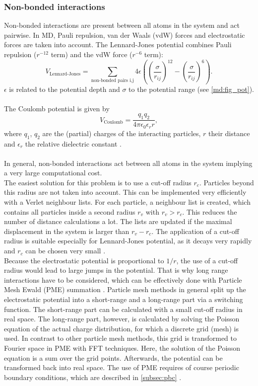\subsubsection{Non-bonded interactions}
Non-bonded interactions are present between all atoms in the system and act pairwise. In MD, Pauli repulsion, van der Waals (vdW) forces and electrostatic forces are taken into account.
The Lennard-Jones potential combines Pauli repulsion ($r^{-12}$ term) and the vdW force ($r^{-6}$ term):
\begin{equation}
V_\text{Lennard-Jones} = \sum_{\text{non-bonded pairs i,j}} 4 \epsilon\left(\left(\frac{\sigma}{r_{ij}}\right)^{12} - \left(\frac{\sigma}{r_{ij}}\right)^6\right).
\end{equation}
$\epsilon$ is related to the potential depth and $\sigma$ to the potential range (see \autoref{md:fig_pot}).\\
\\
The Coulomb potential is given by
\begin{equation}
V_\text{Coulomb} = \frac{q_1 q_2}{4 \pi \epsilon_0 \epsilon_r r},
\end{equation}
where $q_1$, $q_2$ are the (partial) charges of the interacting particles, $r$ their distance and $\epsilon_r$ the relative dielectric constant \autocite[p. 65-71]{gromacsManual}.\\
\\
In general, non-bonded interactions act between all atoms in the system implying a very large computational cost.\\
The easiest solution for this problem is to use a cut-off radius $r_c$. Particles beyond this radius are not taken into account. This can be implemented very efficiently with a Verlet neighbour lists. For each particle, a neighbour list is created, which contains all particles inside a second radius $r_v$ with $r_v > r_c$. This reduces the number of distance calculations a lot. The lists are updated if the maximal displacement in the system is larger than $r_v - r_c$.  The application of a cut-off radius is suitable especially for Lennard-Jones potential, as it decays very rapidly and $r_c$ can be chosen very small \autocite[p. 144]{greenBook}.\\
Because the electrostatic potential is proportional to $1/r$, the use of a cut-off radius would lead to large jumps in the potential. That is why long range interactions have to be considered, which can be effectively done with Particle Mesh Ewald (PME) summation \autocite{pme}. Particle mesh methods in general split up the electrostatic potential into a short-range and a long-range part via a switching function. The short-range part can be calculated with a small cut-off radius in real space. The long-range part, however, is calculated by solving the Poisson equation of the actual charge distribution, for which a discrete grid (mesh) is used. In contrast to other particle mesh methods, this grid is transformed to Fourier space in PME with FFT techniques. Here, the solution of the Poisson equation is a sum over the grid points. Afterwards, the potential can be transformed back into real space. The use of PME requires of course periodic boundary conditions, which are described in \autoref{subsec:pbc} \autocite[p. 246-251]{greenBook}.
